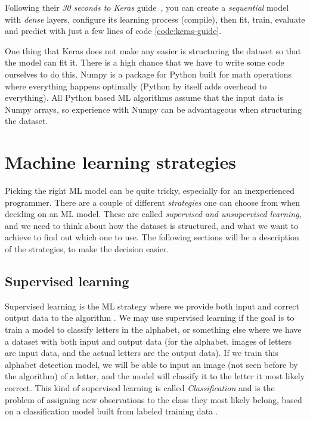 Following their \textit{30 seconds to Keras} guide \cite{keras_docs}, you can create a \textit{sequential} model with \textit{dense}
layers, configure its learning process (compile), then fit, train, evaluate and predict with just a few lines of code \ref{code:keras-guide}.



One thing that Keras does not make any easier is structuring the dataset so that the model can fit it. There is a high chance that we have to write some 
code ourselves to do this. Numpy is a package for Python built for math operations where everything happens optimally (Python by itself adds overhead to everything). 
All Python based ML algorithms assume that the input data is Numpy arrays, so experience with Numpy can be advantageous when structuring the dataset.

\section{Machine learning strategies}
Picking the right ML model can be quite tricky, especially for an inexperienced programmer. There are a couple of different \textit{strategies} one can choose 
from when deciding on an ML model. These are called \textit{supervised and unsupervised learning}, and we need to think about how the dataset is structured, 
and what we want to achieve to find out which one to use. The following sections will be a description of the strategies, to make the decision easier.

\subsection{Supervised learning}
Supervised learning is the ML strategy where we provide both input and correct output data to the algorithm \cite{supervised_learning}. 
We may use supervised learning if the goal is to train a model to classify letters in the alphabet, or something else where we have a dataset with both input 
and output data (for the alphabet, images of letters are input data, and the actual letters are the output data). If we train this alphabet detection model, 
we will be able to input an image (not seen before by the algorithm) of a letter, and the model will classify it to the letter it most likely correct. 
This kind of supervised learning is called \textit{Classification} and is the problem of assigning new observations to the class they most likely belong, 
based on a classification model built from labeled training data \cite{supervised_learning}.

